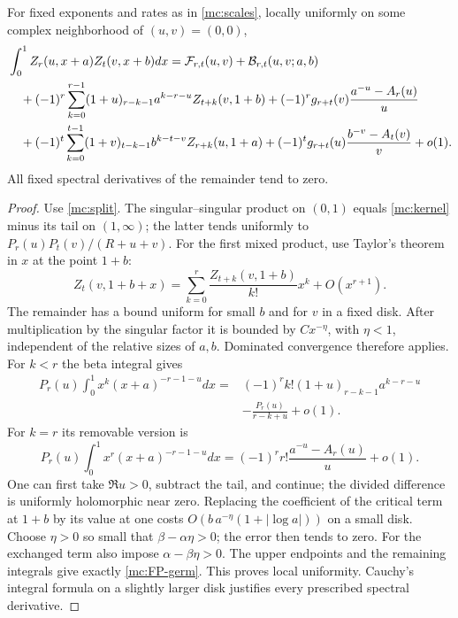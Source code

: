 \begin{lemma}\label{mc:uniform-germ}
For fixed exponents and rates as in \eqref{mc:scales}, locally
uniformly on some complex neighborhood of $(u,v)=(0,0)$,
\begin{align}\label{mc:uniform-expansion}
 &\int_0^1 Z_r(u,x+a)Z_t(v,x+b)dx
    =\mathcal F_{r,t}(u,v)+\mathcal B_{r,t}(u,v;a,b)\notag\\
 &\quad+(-1)^r\sum_{k=0}^{r-1}
     (1+u)_{r-k-1}a^{k-r-u}Z_{t+k}(v,1+b)
   +(-1)^r g_{r+t}(v)\frac{a^{-u}-A_r(u)}u\notag\\
 &\quad+(-1)^t\sum_{k=0}^{t-1}
     (1+v)_{t-k-1}b^{k-t-v}Z_{r+k}(u,1+a)
   +(-1)^t g_{r+t}(u)\frac{b^{-v}-A_t(v)}v+o(1).
\end{align}
All fixed spectral derivatives of the remainder tend to zero.
\end{lemma}

\begin{proof}
Use \eqref{mc:split}. The singular--singular product on $(0,1)$
equals \eqref{mc:kernel} minus its tail on $(1,\infty)$; the latter
tends uniformly to $P_r(u)P_t(v)/(R+u+v)$.
For the first mixed product, use Taylor's theorem in $x$ at the
point $1+b$:
\[
 Z_t(v,1+b+x)=\sum_{k=0}^r
          \frac{Z_{t+k}(v,1+b)}{k!}x^k+O(x^{r+1}).
\]
The remainder has a bound uniform for small $b$ and for $v$ in a
fixed disk. After multiplication by the singular factor it is
bounded by $Cx^{-\eta}$, with $\eta<1$, independent of the
relative sizes of $a,b$. Dominated convergence therefore applies.
For $k<r$ the beta integral gives
\begin{align*}
 P_r(u)\int_0^1x^k(x+a)^{-r-1-u}dx
 ={}&(-1)^rk!(1+u)_{r-k-1}a^{k-r-u}\\
 &-\frac{P_r(u)}{r-k+u}+o(1).
\end{align*}
For $k=r$ its removable version is
\[
 P_r(u)\int_0^1x^r(x+a)^{-r-1-u}dx
   =(-1)^rr!\frac{a^{-u}-A_r(u)}u+o(1).
\]
One can first take $\Re u>0$, subtract the tail, and continue;
the divided difference is uniformly holomorphic near zero.
Replacing the coefficient of the critical term at $1+b$ by its
value at one costs $O(b\,a^{-\eta}(1+|\log a|))$ on a small disk.
Choose $\eta>0$ so small that $\beta-\alpha\eta>0$; the error
then tends to zero. For the exchanged term also impose
$\alpha-\beta\eta>0$. The upper endpoints and the remaining
integrals give exactly \eqref{mc:FP-germ}. This proves local
uniformity. Cauchy's integral formula on a slightly larger disk
justifies every prescribed spectral derivative.
\end{proof}


